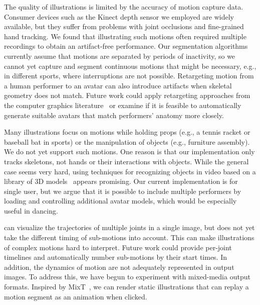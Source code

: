  The quality of \systemname{} illustrations is limited by the accuracy of motion capture data.
%
Consumer devices such as the Kinect depth sensor we employed are widely available, but they  suffer from problems with joint occlusions and fine-grained hand tracking. We found that illustrating such motions often required multiple recordings to obtain an artifact-free performance.
%
Our segmentation algorithms currently assume that motions are separated by periods of inactivity, so we cannot yet capture and segment continuous motions that might be necessary, e.g., in different sports, where interruptions are not possible.
%
Retargeting motion from a human performer to an avatar can also introduce artifacts when skeletal geometry does not match. Future work could apply retargeting approaches from the computer graphics literature~\cite{gleicher1998retargetting} or examine if it is feasible to automatically generate suitable avatars that match performers' anatomy more closely.

 Many illustrations focus on motions while holding props (e.g., a tennis racket or baseball bat in sports) or the manipulation of objects (e.g., furniture assembly). We do not yet support such motions. One reason is that our implementation only tracks skeletons, not hands or their interactions with objects. While the general case seems very hard, using techniques for recognizing objects in video based on a library of 3D models~\cite{kholgade20143d} appears promising.
%
Our current implementation is for single user, but we argue that it is possible to include multiple performers by loading and controlling additional avatar models, which would be especially useful in dancing.

 \systemname{} can visualize the trajectories of multiple joints in a single image, but does not yet take the different timing of sub-motions into account. This can make illustrations of complex motions hard to interpret. Future work could provide per-joint timelines and automatically number sub-motions by their start times. In addition, the dynamics of motion are not adequately represented in output images. To address this, we have begun to experiment with mixed-media output formats. Inspired by MixT~\cite{Chi:2012:MAG:2380116.2380130}, we can render static illustrations that can replay a motion segment as an animation when clicked.


